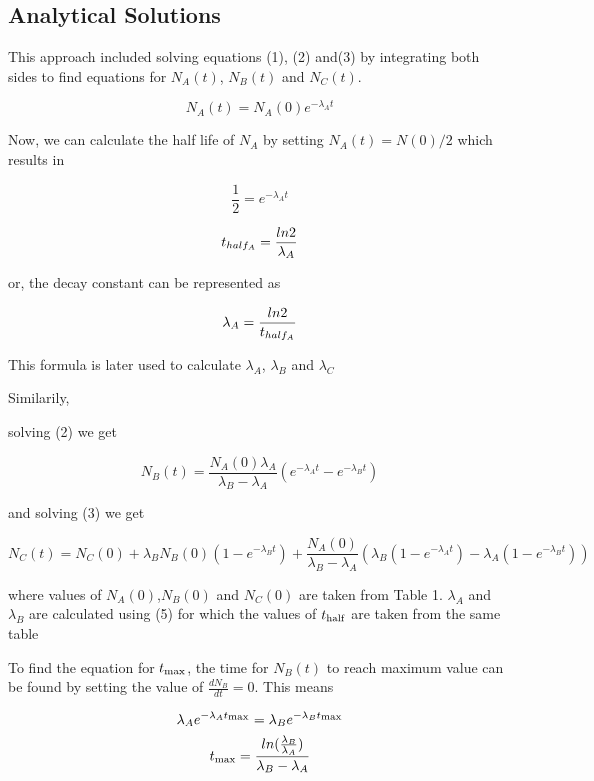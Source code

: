 \documentclass[11pt, oneside]{article}   	%
\begin{document}
\subsection{Analytical Solutions}
This approach included solving equations (1), (2) and(3) by integrating both sides to find equations for $N_A(t)$, $N_B(t)$ and $N_C(t)$. 

\begin{equation}
N_A(t)  = N_A(0)e^{-\lambda_A t}
\end{equation}

Now, we can calculate the half life of $N_A$ by setting $N_A(t) = N(0)/2$ which results in

$$\frac{1}{2} = e^{-\lambda_A t} $$


$$t\textsubscript{$half_A$}  = \frac{ln2}{\lambda_A}$$

or, the decay constant can be represented as 

\begin{equation}
\lambda_A = \frac{ln2}{t\textsubscript{$half_A$}}
\end{equation}

This formula is later used to calculate $\lambda_A$, $\lambda_B$ and $\lambda_C$  

Similarily,

solving (2) we get 

\begin{equation}
N_B(t)  = \frac{N_A(0)\lambda_A}{\lambda_B - \lambda_A} (e^{-\lambda_A t} - e^{-\lambda_B t})
\end{equation}

and solving (3) we get

\begin{equation}
N_C(t)  = N_C(0) + \lambda_B N_B(0) (1 - e^{-\lambda_Bt}) + \frac{N_A(0)}{\lambda_B - \lambda_A} (\lambda_B(1 - e^{-\lambda_A t}) - \lambda_A(1 -e^{-\lambda_B t}))
\end{equation}


where values of $N_A(0)$,$N_B(0)$ and $N_C(0)$ are taken from Table 1. $\lambda_A$ and $\lambda_B$ are calculated using (5) for which the values of $t\textsubscript{half}$ are taken from the same table

To find the equation for $t\textsubscript{max}$, the time for $N_B(t)$ to reach maximum value can be found by setting the value of $\frac{dN_B}{dt} = 0$. This means

$$\lambda_A e^{-\lambda_A t\textsubscript{max}} = \lambda_B e^{-\lambda_B t\textsubscript{max}} $$
$$t\textsubscript{max} = \frac{ln (\frac{\lambda_B}{\lambda_A})}{\lambda_B - \lambda_A}$$
\end{document}
